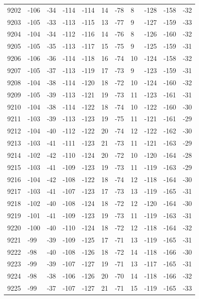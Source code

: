 \begin{table}[H]
\begin{tabular}{lllllllllll}
9202 & -106 & -34 & -114 & -114 & 14 & -78 & 8 & -128 & -158 & -32 \\
9203 & -105 & -33 & -113 & -115 & 13 & -77 & 9 & -127 & -159 & -33 \\
9204 & -104 & -34 & -112 & -116 & 14 & -76 & 8 & -126 & -160 & -32 \\
9205 & -105 & -35 & -113 & -117 & 15 & -75 & 9 & -125 & -159 & -31 \\
9206 & -106 & -36 & -114 & -118 & 16 & -74 & 10 & -124 & -158 & -32 \\
9207 & -105 & -37 & -113 & -119 & 17 & -73 & 9 & -123 & -159 & -31 \\
9208 & -104 & -38 & -114 & -120 & 18 & -72 & 10 & -124 & -160 & -32 \\
9209 & -105 & -39 & -113 & -121 & 19 & -73 & 11 & -123 & -161 & -31 \\
9210 & -104 & -38 & -114 & -122 & 18 & -74 & 10 & -122 & -160 & -30 \\
9211 & -103 & -39 & -113 & -123 & 19 & -75 & 11 & -121 & -161 & -29 \\
9212 & -104 & -40 & -112 & -122 & 20 & -74 & 12 & -122 & -162 & -30 \\
9213 & -103 & -41 & -111 & -123 & 21 & -73 & 11 & -121 & -163 & -29 \\
9214 & -102 & -42 & -110 & -124 & 20 & -72 & 10 & -120 & -164 & -28 \\
9215 & -103 & -41 & -109 & -123 & 19 & -73 & 11 & -119 & -163 & -29 \\
9216 & -104 & -42 & -108 & -122 & 18 & -74 & 12 & -118 & -164 & -30 \\
9217 & -103 & -41 & -107 & -123 & 17 & -73 & 13 & -119 & -165 & -31 \\
9218 & -102 & -40 & -108 & -124 & 18 & -72 & 12 & -120 & -164 & -30 \\
9219 & -101 & -41 & -109 & -123 & 19 & -73 & 11 & -119 & -163 & -31 \\
9220 & -100 & -40 & -110 & -124 & 18 & -72 & 12 & -118 & -164 & -32 \\
9221 & -99 & -39 & -109 & -125 & 17 & -71 & 13 & -119 & -165 & -31 \\
9222 & -98 & -40 & -108 & -126 & 18 & -72 & 14 & -118 & -166 & -30 \\
9223 & -99 & -39 & -107 & -127 & 19 & -71 & 13 & -117 & -165 & -31 \\
9224 & -98 & -38 & -106 & -126 & 20 & -70 & 14 & -118 & -166 & -32 \\
9225 & -99 & -37 & -107 & -127 & 21 & -71 & 15 & -119 & -165 & -33 \\

\end{tabular}
\end{table}
